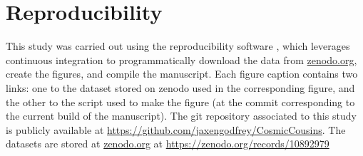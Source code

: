 \section{Reproducibility}
\label{sec:reproducibility}

This study was carried out using the reproducibility software \href{https://github.com/showyourwork/showyourwork}{\showyourwork} \citep{2110.06271}, which leverages continuous integration to programmatically download the data from \href{https://zenodo.org/}{zenodo.org}, create the figures, and compile the manuscript. Each figure caption contains two links: one to the dataset stored on zenodo used in the corresponding figure, and the other to the script used to make the figure (at the commit corresponding to the current build of the manuscript). The git repository associated to this study is publicly available at \url{https://github.com/jaxengodfrey/CosmicCousins}. The datasets are stored at \href{https://zenodo.org/}{zenodo.org} at \url{https://zenodo.org/records/10892979} 
